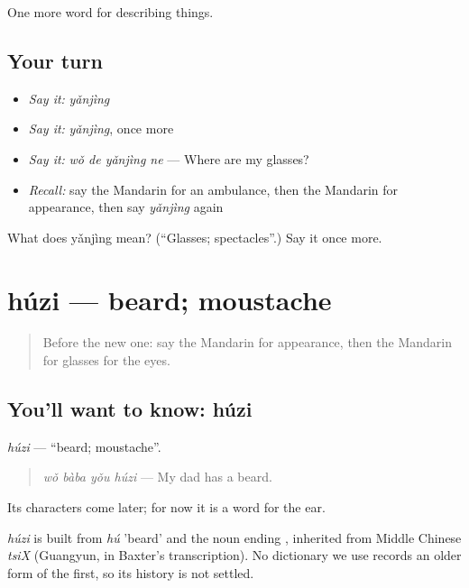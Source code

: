 \begin{grammarlens}[title={What you've built}]
One more word for describing things.
\end{grammarlens}

\subsection*{Your turn}
\begin{itemize}
\raggedright
  \item \emph{Say it:} \emph{yǎnjìng}
  \item \emph{Say it:} \emph{yǎnjìng}, once more
  \item \emph{Say it:} \emph{wǒ de yǎnjìng ne} — Where are my glasses?
  \item \emph{Recall:} say the Mandarin for an ambulance, then the Mandarin for appearance, then say \emph{yǎnjìng} again
\end{itemize}

\begin{tcolorbox}[breakable,colback=teal!4,colframe=teal!35!black,title={Before you move on}]
What does yǎnjìng mean? (\textquotedblleft{}Glasses; spectacles\textquotedblright{}.) Say it once more.
\end{tcolorbox}
\section[húzi]{húzi — beard; moustache}

\label{lesson:ZH-C233-huzi}



\begin{quote}
Before the new one: say the Mandarin for appearance, then the Mandarin for glasses for the eyes.
\end{quote}

\subsection*{You'll want to know: húzi}
\emph{húzi} — \textquotedblleft{}beard; moustache\textquotedblright{}.

\begin{quote}
\emph{wǒ bàba yǒu húzi} — My dad has a beard.
\end{quote}

Its characters come later; for now it is a word for the ear.

\begin{cousinweb}
\emph{húzi} is built from \emph{hú} 'beard' and the noun ending , inherited from Middle Chinese \emph{tsiX} (Guangyun, in Baxter's transcription). No dictionary we use records an older form of the first, so its history is not settled.
\end{cousinweb}

